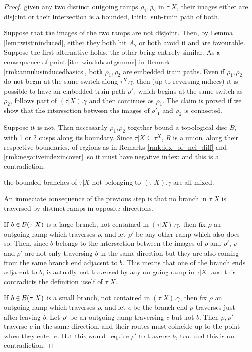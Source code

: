 \begin{proof}
 given any two distinct outgoing ramps $\rho_1,\rho_2$ in $\tau|X$, their images either are disjoint or their intersection is a bounded, initial sub-train path of both.

Suppose that the images of the two ramps are not disjoint. Then, by Lemma \ref{lem:twistininduced}, either they both hit $A_\gamma$ or both avoid it and are favourable. Suppose the first alternative holds, the other being entirely similar. As a consequence of point \ref{itm:windaboutgamma} in Remark \ref{rmk:annulusinducedbasics}, both $\rho_1,\rho_2$ are embedded train paths. Even if $\rho_1,\rho_2$ do not begin at the same switch along $\tau^X.\gamma$, then (up to reversing indices) it is possible to have an embedded train path $\rho'_1$ which begins at the same switch as $\rho_2$, follows part of $(\tau|X).\gamma$ and then continues as $\rho_1$. The claim is proved if we show that the intersection between the images of $\rho'_1$ and $\rho_2$ is connected.

Suppose it is not. Then necessarily $\rho_1,\rho_2$ together bound a topological disc $B$, with 1 or 2 cusps along its boundary. Since $\tau|X\subseteq \tau^X$, $B$ is a union, along their respective boundaries, of regions as in Remarks \ref{rmk:idx_of_nei_diff} and \ref{rmk:negativeindexincover}, so it must have negative index: and this is a contradiction.

 the bounded branches of $\tau|X$ not belonging to $(\tau|X).\gamma$ are all mixed.

An immediate consequence of the previous step is that no branch in $\tau|X$ is traversed by distinct ramps in opposite directions.

If $b\in\mathcal B(\tau|X)$ is a large branch, not contained in $(\tau|X).\gamma$, then fix $\rho$ an outgoing ramp which traverses $\rho$, and let $\rho'$ be any other ramp which also does so. Then, since $b$ belongs to the intersection between the images of $\rho$ and $\rho'$, $\rho$ and $\rho'$ are not only traversing $b$ in the same direction but they are also coming from the same branch end adjacent to $b$. This means that one of the branch ends adjacent to $b$, is actually not traversed by any outgoing ramp in $\tau|X$: and this contradicts the definition itself of $\tau|X$.

If $b\in\mathcal B(\tau|X)$ is a small branch, not contained in $(\tau|X).\gamma$, then fix $\rho$ an outgoing ramp which traverses $\rho$, and let $e$ be the branch end $\rho$ traverses just after leaving $b$. Let $\rho'$ be an outgoing ramp traversing $e$ but not $b$. Then $\rho,\rho'$ traverse $e$ in the same direction, and their routes must coincide up to the point when they enter $e$. But this would require $\rho'$ to traverse $b$, too: and this is our contradiction.


\end{proof}
